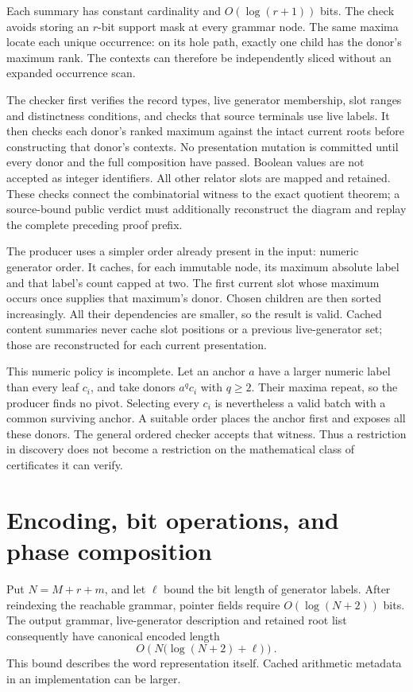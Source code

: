 Each summary has constant cardinality and $O(\log(r+1))$ bits. The
check avoids storing an $r$-bit support mask at every grammar node.
The same maxima locate each unique occurrence: on its hole path,
exactly one child has the donor's maximum rank. The contexts can
therefore be independently sliced without an expanded occurrence scan.

The checker first verifies the record types, live generator membership,
slot ranges and distinctness conditions, and checks that source terminals
use live labels. It then checks each donor's ranked maximum against the
intact current roots before constructing that donor's contexts. No
presentation mutation is committed until every donor and the full
composition have passed. Boolean values are not accepted as integer
identifiers. All other relator slots are mapped and retained. These
checks connect the combinatorial witness to the
exact quotient theorem; a source-bound public verdict must additionally
reconstruct the diagram and replay the complete preceding proof prefix.

The producer uses a simpler order already present in the input: numeric
generator order. It caches, for each immutable node, its maximum
absolute label and that label's count capped at two. The first current
slot whose maximum occurs once supplies that maximum's donor. Chosen
children are then sorted increasingly. All their dependencies are
smaller, so the result is valid. Cached content summaries never cache
slot positions or a previous live-generator set; those are reconstructed
for each current presentation.

This numeric policy is incomplete. Let an anchor $a$ have a larger
numeric label than every leaf $c_i$, and take donors $a^q c_i$ with
$q\ge2$. Their maxima repeat, so the producer finds no pivot. Selecting
every $c_i$ is nevertheless a valid batch with a common surviving
anchor. A suitable order places the anchor first and exposes all
these donors. The general ordered checker accepts that witness.
Thus a restriction in discovery does not become a restriction on the
mathematical class of certificates it can verify.

\section{Encoding, bit operations, and phase composition}
\label{alg:complexity}

Put $N=M+r+m$, and let $\ell$ bound the bit length of generator labels.
After reindexing the reachable grammar, pointer fields require
$O(\log(N+2))$ bits. The output grammar, live-generator description and
retained root list consequently have canonical encoded length
\[
 O\!\left(N\bigl(\log(N+2)+\ell\bigr)\right).
\]
This bound describes the word representation itself. Cached arithmetic
metadata in an implementation can be larger.

